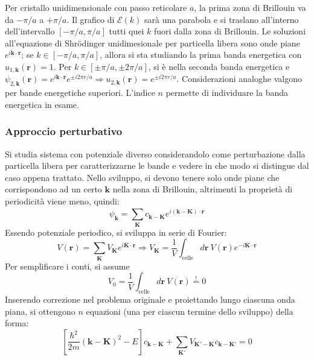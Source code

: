 \documentclass[10pt, a4paper]{scrartcl}
\numberwithin{equation}{subsection}
\theoremstyle{style1}
\theoremstyle{style2}
\begin{document}
Per cristallo unidimensionale con passo reticolare $a$, la prima zona di Brillouin va da $- \pi / a$ a $ + \pi / a$. Il grafico di $\mathscr{E}(k)$ sar\`a una parabola e si traslano all'interno dell'intervallo $[-\pi/a,\pi / a]$ tutti quei $k$ fuori dalla zona di Brillouin. Le soluzioni all'equazione di Shr\"odinger unidimesionale per particella libera sono onde piane $e^{i \mathbf{k} \cdot \mathbf{r} } $; se $k\in [-\pi / a, \pi /a]$, allora si sta studiando la prima banda energetica con $u_{1,\mathbf{k} } (\mathbf{r} ) = 1$. Per $k\in [\pm\pi / a, \pm2 \pi /a]$, si \`e nella seconda banda energetica e $\psi _{2,\mathbf{k} }(\mathbf{r} ) = e^{i \mathbf{k} \cdot \mathbf{r} }  e^{\pm i 2\pi r / a }  \Rightarrow u_{2,\mathbf{k}}(\mathbf{r} ) =e^{\pm i 2\pi r / a}  $. Considerazioni analoghe valgono per bande energetiche superiori. L'indice $n$ permette di individuare la banda energetica in esame.

\subsubsection{Approccio perturbativo}


Si studia sistema con potenziale diverso considerandolo come perturbazione dalla particella libera per caratterizzarne le bande e vedere in che modo si distingue dal caso appena trattato. Nello sviluppo, si devono tenere solo onde piane che corrispondono ad un certo $\mathbf{k} $ nella zona di Brillouin, altrimenti la propriet\`a di periodicit\`a viene meno, quindi:
\begin{equation}
	\psi _{\mathbf{k} } = \sum_{\mathbf{K} }^{} c_{\mathbf{k} - \mathbf{K} } e^{i(\mathbf{k} -\mathbf{K} ) \cdot  \mathbf{r} } 
\end{equation}
Essendo potenziale periodico, si sviluppa in serie di Fourier:
\begin{equation}
	V(\mathbf{r} ) = \sum_{\mathbf{K} }^{} V_\mathbf{K} e^{i \mathbf{K} \cdot \mathbf{ r} } \Rightarrow V_\mathbf{K} = \frac{1}{V}\int_{\text{celle}} d\mathbf{r}  \ V(\mathbf{r} ) e^{-i\mathbf{K} \cdot \mathbf{r} } 
\end{equation}
Per semplificare i conti, si assume
\[
V_0 = \frac{1}{V} \int_{\text{celle}} d\mathbf{r} \ V(\mathbf{r} ) \stackrel{!}{=} 0
\] 
Inserendo correzione nel problema originale e proiettando lungo ciascuna onda piana, si ottengono $n$ equazioni (una per ciascun termine dello sviluppo) della forma:
\begin{equation}
	\left[ \frac{\hbar ^2}{2m} (\mathbf{k}-\mathbf{K} )^2 - E \right] c_{\mathbf{k} -\mathbf{K} } + \sum_{\mathbf{K} '}^{} V_{\mathbf{K} ' - \mathbf{K} } c_{\mathbf{k} -\mathbf{K} '} =0
\end{equation}
\end{document}
